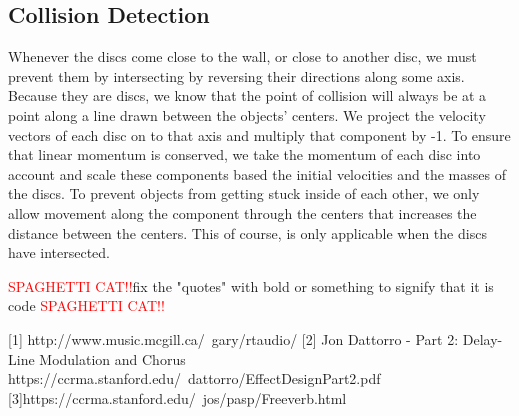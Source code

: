 \documentclass[pdftext,twoside,10pt]{article}
\newcommand{\spag}{\textcolor{red}{SPAGHETTI CAT!!}}
\begin{document}
\subsection{Collision Detection}
Whenever the discs come close to the wall, or close to another disc, we must prevent them by intersecting by reversing their directions along some axis. Because they are discs, we know that the point of collision will always be at a point along a line drawn between the objects' centers. We project the velocity vectors of each disc on to that axis and multiply that component by -1. To ensure that linear momentum is conserved, we take the momentum of each disc into account and scale these components based the initial velocities and the masses of the discs. To prevent objects from getting stuck inside of each other, we only allow movement along the component through the centers that increases the distance between the centers. This of course, is only applicable when the discs have intersected.

\spag fix the "quotes" with bold or something to signify that it is code \spag

[1] http://www.music.mcgill.ca/~gary/rtaudio/
[2] Jon Dattorro - Part 2: Delay-Line Modulation and Chorus  
https://ccrma.stanford.edu/~dattorro/EffectDesignPart2.pdf 
[3]https://ccrma.stanford.edu/~jos/pasp/Freeverb.html 
\end{document}
